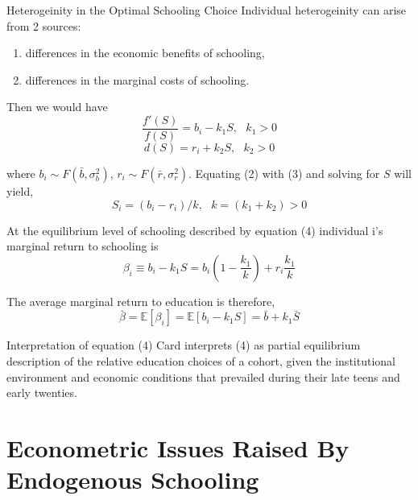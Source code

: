 \documentclass{beamer}
\begin{document}
\begin{frame}{Heterogeinity in the Optimal Schooling Choice}
    Individual heterogeinity can arise from 2 sources: 
    \begin{enumerate}
        \item differences in the economic benefits of schooling,
        \item differences in the marginal costs of schooling.
    \end{enumerate}
    
Then we would have 
\begin{equation}
    \frac{f'(S)}{f(S)}= b_{i} - k_{1}S,~~~ k_{1}>0
\end{equation}
\begin{equation}
    d(S) = r_{i} + k_{2}S, ~~~k_{2}>0
\end{equation}

where $b_{i}\sim F(\bar{b},\sigma_{b}^{2})$, $r_{i}\sim F(\bar{r},\sigma_{r}^{2})$. Equating (2) with (3) and solving for $S$ will yield, 
\begin{equation}
    S_{i} =(b_{i}-r_{i})/k,~~~k=(k_{1}+k_{2})>0
\end{equation}

\end{frame}

\begin{frame}{}
At the equilibrium level of schooling described by equation (4) individual i’s marginal return to schooling is
\begin{equation*}
    \beta_{i} \equiv b_{i} - k_{1}S = b_{i}(1-\frac{k_{1}}{k}) + r_{i}\frac{k_{1}}{k}
\end{equation*}

The average marginal return to education is therefore, 
\begin{equation*}
    \bar{\beta} = \mathbb{E}[\beta_{i}]= \mathbb{E}[b_{i}-k_{1}S]= \bar{b} + k_{1}\bar{S}
\end{equation*}

\begin{block}{Interpretation of equation (4)}
 Card interprets (4) as partial equilibrium description of the relative education choices of a cohort, given the institutional environment and economic conditions that prevailed during their late teens and early twenties.
\end{block}
\end{frame}


\section{Econometric Issues Raised By Endogenous Schooling}
\end{document}
